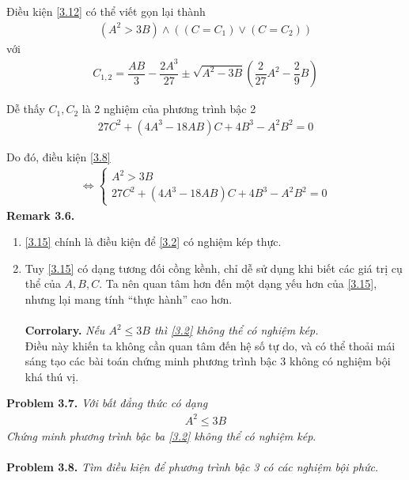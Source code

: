 \documentclass[a4paper,oneside]{book}
\numberwithin{equation}{chapter}
\begin{document}
Điều kiện \eqref{3.12} có thể viết gọn lại thành 
\begin{align}
\left( {{A^2} > 3B} \right) \wedge \left( {\left( {C = {C_1}} \right) \vee \left( {C = {C_2}} \right)} \right)
\end{align}
với 
\begin{align}
{C_{1,2}} = \dfrac{{AB}}{3} - \dfrac{{2{A^3}}}{{27}} \pm \sqrt {{A^2} - 3B} \left( {\dfrac{2}{{27}}{A^2} - \dfrac{2}{9}B} \right)
\end{align}

Dễ thấy ${C_1},{C_2}$ là 2 nghiệm của phương trình bậc 2 
\begin{align}
27{C^2} + \left( {4{A^3} - 18AB} \right)C + 4{B^3} - {A^2}{B^2} = 0
\end{align}

Do đó, điều kiện \eqref{3.8}
\begin{align}
\label{3.15}
 \Leftrightarrow \left\{ {\begin{array}{*{20}{c}}
{{A^2} > 3B}\\
{27{C^2} + \left( {4{A^3} - 18AB} \right)C + 4{B^3} - {A^2}{B^2} = 0}
\end{array}} \right.
\end{align}
\textbf{Remark 3.6.}
\begin{enumerate}
\item \eqref{3.15} chính là điều kiện để \eqref{3.2} có nghiệm kép thực.
\item Tuy \eqref{3.15} có dạng tương đối cồng kềnh, chỉ dễ sử dụng khi biết các giá trị cụ thể của $A,B,C$. Ta nên quan tâm hơn đến một dạng yếu hơn của \eqref{3.15}, nhưng lại mang tính ``thực hành'' cao hơn.\\
\\
\textbf{Corrolary.} \textit{Nếu ${A^2} \le 3B$ thì \eqref{3.2} không thể có nghiệm kép.}\\

Điều này khiến ta không cần quan tâm đến hệ số tự do, và có thể thoải mái sáng tạo các bài toán chứng minh phương trình bậc 3 không có nghiệm bội khá thú vị.
\end{enumerate}
\vspace{0.5cm}
\textbf{Problem 3.7.} \textit{Với bất đẳng thức có dạng}
\begin{align}
{A^2} \le 3B
\end{align}
\textit{Chứng minh phương trình bậc ba \eqref{3.2} không thể có nghiệm kép}.\\
\\
\textbf{Problem 3.8.} \textit{Tìm điều kiện để phương trình bậc 3 có các nghiệm bội phức.}
\end{document}
